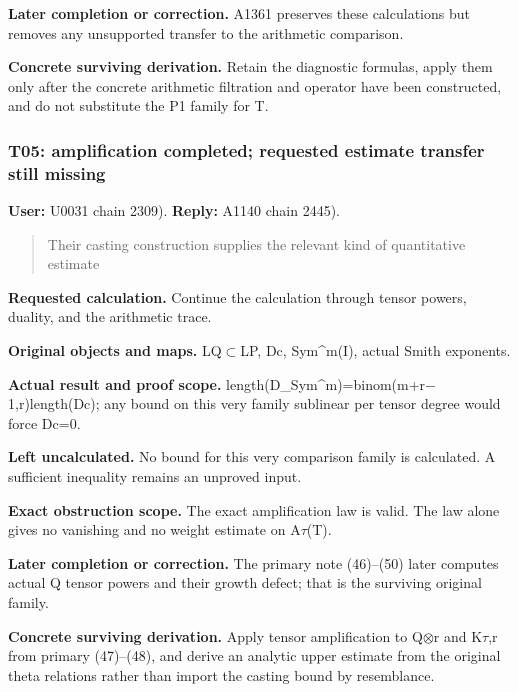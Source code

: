 \textbf{Later completion or correction.} A1361 preserves these
calculations but removes any unsupported transfer to the arithmetic
comparison.

\textbf{Concrete surviving derivation.} Retain the diagnostic formulas,
apply them only after the concrete arithmetic filtration and operator
have been constructed, and do not substitute the P1 family for T.

\subsubsection{T05: amplification completed; requested estimate transfer
still
missing}\label{TranscriptLedgerStage:t05-amplification-completed-requested-estimate-transfer-still-missing}

\textbf{User:} U0031
\protect{} chain 2309).
\textbf{Reply:} A1140
\protect{} chain 2445).

\begin{quote}
Their casting construction supplies the relevant kind of quantitative
estimate
\end{quote}

\textbf{Requested calculation.} Continue the calculation through tensor
powers, duality, and the arithmetic trace.

\textbf{Original objects and maps.}
LQ\allowbreak{}\ensuremath{⊂}\allowbreak{}LP, Dc, Sym\^{}m(I), actual
Smith exponents.

\textbf{Actual result and proof scope.}
length(D\_Sym\textasciicircum{}m)=binom(m+r\allowbreak{}\ensuremath{−}\allowbreak{}1,r)length(Dc);
any bound on this very family sublinear per tensor degree would force
Dc=0.

\textbf{Left uncalculated.} No bound for this very comparison family is
calculated. A sufficient inequality remains an unproved input.

\textbf{Exact obstruction scope.} The exact amplification law is valid.
The law alone gives no vanishing and no weight estimate on
A\allowbreak{}\ensuremath{τ}\allowbreak{}(T).

\textbf{Later completion or correction.} The primary note (46)--(50)
later computes actual Q tensor powers and their growth defect; that is
the surviving original family.

\textbf{Concrete surviving derivation.} Apply tensor amplification to
Q\allowbreak{}\ensuremath{⊗}\allowbreak{}r and
K\allowbreak{}\ensuremath{τ}\allowbreak{},r from primary (47)--(48), and
derive an analytic upper estimate from the original theta relations
rather than import the casting bound by resemblance.

